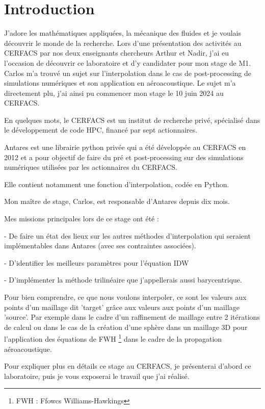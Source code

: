 \section*{Introduction}

J'adore les mathématiques appliquées, la mécanique des fluides et je voulais découvrir le monde de la recherche. Lors d'une présentation des activités au
\ac{CERFACS} par nos deux enseignants chercheurs Arthur et Nadir, j'ai eu l'occasion de découvrir ce laboratoire et d'y candidater pour mon stage de M1. Carlos m'a trouvé un sujet sur l'interpolation dans le cas de post-processing de simulations numériques et son application en aéroacoustique. Le sujet m'a directement plu, j'ai ainsi pu commencer mon stage le 10 juin 2024 au CERFACS.

En quelques mots, le CERFACS est un institut de recherche privé, spécialisé dans le développement de code \ac{HPC}, financé par sept actionnaires.

Antares\cite{antares} est une librairie python privée qui a été développée au CERFACS en 2012 et a pour objectif de faire du pré et post-processing sur des simulations numériques utilisées par les actionnaires du CERFACS.

Elle contient notamment une fonction d'interpolation, codée en Python.

Mon maître de stage, Carlos, est responsable d'Antares depuis dix mois. 

Mes missions principales lors de ce stage ont été :

- De faire un état des lieux sur les autres méthodes d'interpolation qui seraient 
implémentables dans Antares (avec ses contraintes associées).

- D'identifier les meilleurs paramètres pour l'équation \ac{IDW} %

- D'implémenter la méthode trilinéaire que j'appellerais aussi barycentrique.

Pour bien comprendre, ce que nous voulons interpoler, ce sont les valeurs aux points d'un maillage dit 'target' grâce aux valeurs aux points d'un maillage 'source'. Par exemple dans le cadre d'un raffinement de maillage entre 2 itérations de calcul ou dans le cas de la création d'une sphère dans un maillage 3D pour l'application des équations de FWH \footnote{FWH : Ffowcs Williams-Hawkings} dans le cadre de la propagation aéroacoustique.

Pour expliquer plus en détails ce stage au CERFACS, je présenterai d'abord ce laboratoire, puis je vous exposerai le travail que j'ai réalisé.

% 
